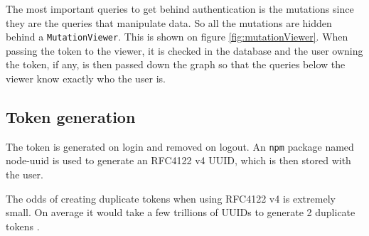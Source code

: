 The most important queries to get behind authentication is the mutations since they are the queries that manipulate data. So all the mutations are hidden behind a \verb+MutationViewer+. This is shown on figure \ref{fig:mutationViewer}. When passing the token to the viewer, it is checked in the database and the user owning the token, if any, is then passed down the graph so that the queries below the viewer know exactly who the user is. 


\subsection{Token generation}
The token is generated on login and removed on logout. An \verb+npm+ package named node-uuid is used to generate an RFC4122 v4 UUID, which is then stored with the user. 

The odds of creating duplicate tokens when using RFC4122 v4 is extremely small. On average it would take a few trillions of UUIDs to generate 2 duplicate tokens \citep{authentication:uuid}.
